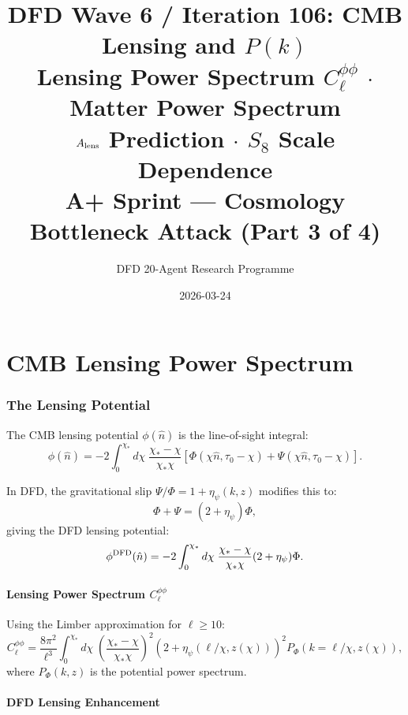 \documentclass[11pt,a4paper]{article}
\title{DFD Wave 6 / Iteration 106: CMB Lensing and $P(k)$\\[6pt]
\large Lensing Power Spectrum $C_\ell^{\phi\phi}$ $\cdot$ Matter Power Spectrum\\
$A_{\rm lens}$ Prediction $\cdot$ $S_8$ Scale Dependence\\[6pt]
\normalsize A+ Sprint --- Cosmology Bottleneck Attack (Part 3 of 4)}
\author{DFD 20-Agent Research Programme}
\date{2026-03-24}
\theoremstyle{remark}
\begin{document}
\maketitle
\tableofcontents
\newpage

\part{CMB Lensing Power Spectrum}
\label{part:lensing}

\section{The Lensing Potential}

The CMB lensing potential $\phi(\hat{n})$ is the line-of-sight integral:
\begin{equation}
\phi(\hat{n}) = -2\int_0^{\chi_*} d\chi\;\frac{\chi_* - \chi}{\chi_*\chi}
\left[\Phi(\chi\hat{n}, \tau_0 - \chi) + \Psi(\chi\hat{n}, \tau_0 - \chi)\right].
\label{eq:lensing-potential}
\end{equation}

In DFD, the gravitational slip $\Psi/\Phi = 1 + \eta_\psi(k, z)$ modifies this to:
\begin{equation}
\Phi + \Psi = (2 + \eta_\psi)\Phi,
\end{equation}
giving the DFD lensing potential:
\begin{equation}
\phi^{\rm DFD}(\hat{n}) = -2\int_0^{\chi_*} d\chi\;\frac{\chi_* - \chi}{\chi_*\chi}
(2 + \eta_\psi)\Phi.
\end{equation}

\subsection{Lensing Power Spectrum $C_\ell^{\phi\phi}$}

Using the Limber approximation for $\ell \geq 10$:
\begin{equation}
C_\ell^{\phi\phi} = \frac{8\pi^2}{\ell^3}\int_0^{\chi_*} d\chi\;
\left(\frac{\chi_* - \chi}{\chi_*\chi}\right)^2
\left(2 + \eta_\psi(\ell/\chi, z(\chi))\right)^2
P_\Phi(k = \ell/\chi, z(\chi)),
\end{equation}
where $P_\Phi(k, z)$ is the potential power spectrum.

\subsection{DFD Lensing Enhancement}
\end{document}
